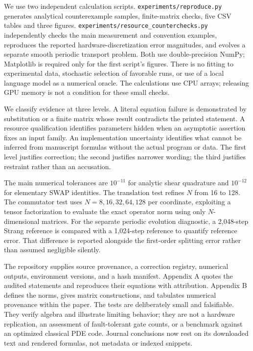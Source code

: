 We use two independent calculation scripts.
\nolinkurl{experiments/reproduce.py} generates analytical counterexample
samples, finite-matrix checks, five CSV tables and three figures.
\nolinkurl{experiments/resource_counterchecks.py} independently checks the
main measurement and convention examples, reproduces the reported
hardware-discretization error magnitudes, and evolves a separate smooth
periodic transport problem. Both use double-precision NumPy; Matplotlib
is required only for the first script's figures. There is no fitting to
experimental data, stochastic selection of favorable runs, or use of a
local language model as a numerical oracle. The calculations use CPU
arrays; releasing GPU memory is not a condition for these small checks.

We classify evidence at three levels. A literal equation failure is
demonstrated by substitution or a finite matrix whose result contradicts
the printed statement. A resource qualification identifies parameters
hidden when an asymptotic assertion fixes an input family. An
implementation uncertainty identifies what cannot be inferred from
manuscript formulas without the actual program or data. The first level
justifies correction; the second justifies narrower wording; the third
justifies restraint rather than an accusation.

The main numerical tolerances are \(10^{-11}\) for analytic shear
quadrature and \(10^{-12}\) for elementary SWAP identities. The
translation test refines \(N\) from 16 to 128. The commutator test uses
\(N=8,16,32,64,128\) per coordinate, exploiting a tensor factorization
to evaluate the exact operator norm using only \(N\)-dimensional
matrices. For the separate periodic evolution diagnostic, a 2,048-step
Strang reference is compared with a 1,024-step reference to quantify
reference error. That difference is reported alongside the first-order
splitting error rather than assumed negligible silently.

The repository supplies source provenance, a correction registry,
numerical outputs, environment versions, and a hash manifest. Appendix A
quotes the audited statements and reproduces their equations with
attribution. Appendix B defines the norms, gives matrix constructions,
and tabulates numerical provenance within the paper. The tests are
deliberately small and falsifiable. They verify algebra and illustrate
limiting behavior; they are not a hardware replication, an assessment of
fault-tolerant gate counts, or a benchmark against an optimized
classical PDE code. Journal conclusions now rest on its downloaded text
and rendered formulas, not metadata or indexed snippets.

